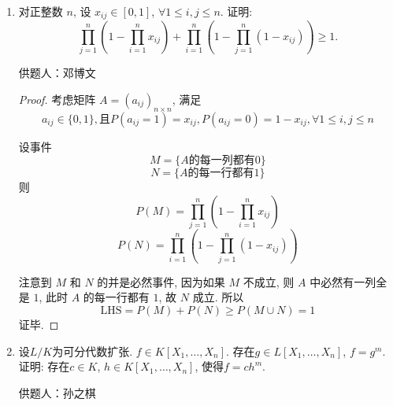 \documentclass[lang=cn,12pt,a4paper]{elegantpaper}
\begin{document}
\begin{enumerate}
\begin{proof}
\begin{enumerate}
			故自然得到要求证等式。
			\item 不难看出
			\[
			\begin{aligned}
				&\quad\sum_{n\geq 1, n \textbf{奇数}}\dfrac{n^5 e^{-n\pi}}{1+e^{-n\pi}}=F(e^{-\pi}) \\
				&=G(e^{-\pi})-34G(e^{-2\pi})+64G(e^{-4\pi})=A(\frac{i}{2})-34A(i)+64A(2i).
			\end{aligned}
			\]
			其中
			\[A(\tau) =\sum_{n \geq 1} \sigma_{5}(n) e^{2\pi i n \tau}\]
			自然满足
			\[ 1-504A(\tau)=E_{6}(\tau).\]

			$E_6$为模形式，所以不难知道
			\[ E_6(\frac{i}{2})=-64E_6(2i).\]
			且有熟知结论
			\[E_6(i)=0.\]
			不难证明上述结论.

		\end{enumerate}
	\end{proof}

	
	\item 对正整数 $n$, 设 $x_{ij} \in [0,1]$, $\forall 1 \leq i,j \leq n$. 证明: \[\prod_{j=1}^{n}(1 - \prod_{i=1}^{n}x_{ij}) + \prod_{i=1}^{n}(1 - \prod_{j=1}^{n}(1 - x_{ij})) \geq 1.\]


	\begin{flushright}
		\kaishu
		供题人：邓博文
	\end{flushright}

	\begin{proof}

		考虑矩阵 $A = (a_{ij})_{n \times n}$, 满足 \[a_{ij} \in \{0,1\}, \text{且}P(a_{ij} = 1) = x_{ij}, P(a_{ij} = 0) = 1 - x_{ij}, \forall 1 \leq i,j \leq n\]

		设事件 \[M = \{A \text{的每一列都有} 0\}\] \[N = \{A \text{的每一行都有} 1\}\] 则 \[P(M) = \prod_{j=1}^{n}(1 - \prod_{i=1}^{n}x_{ij})\] \[P(N) = \prod_{i=1}^{n}(1 - \prod_{j=1}^{n}(1 - x_{ij}))\]

		注意到 $M$ 和 $N$ 的并是必然事件, 因为如果 $M$ 不成立, 则 $A$ 中必然有一列全是 $1$, 此时 $A$ 的每一行都有 $1$, 故 $N$ 成立. 所以 \[\text{LHS} = P(M) + P(N) \geq P(M \cup N) = 1\] 证毕.

	\end{proof}
		
	\item 设$L/K$为可分代数扩张. $f\in K[X_1,\dots,X_n]$. 存在$g\in L[X_1,\dots,X_n]$, $f=g^m$. 证明: 存在$c\in K$, $h\in K[X_1,\dots,X_n]$, 使得$f=ch^m$.

	\begin{flushright}
		\kaishu
		供题人：孙之棋
	\end{flushright}
		

\end{enumerate}
\end{document}
